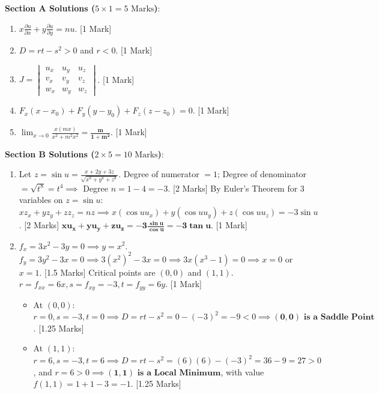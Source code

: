 \begin{solutionbox}
\noindent\textbf{Section A Solutions ($5 \times 1 = 5\text{ Marks}$)}:
\begin{enumerate}
    \item $x \frac{\partial u}{\partial x} + y \frac{\partial u}{\partial y} = n u$. [1 Mark]
    \item $D = rt - s^2 > 0$ and $r < 0$. [1 Mark]
    \item $J = \begin{vmatrix} u_x & u_y & u_z \\ v_x & v_y & v_z \\ w_x & w_y & w_z \end{vmatrix}$. [1 Mark]
    \item $F_x(x-x_0) + F_y(y-y_0) + F_z(z-z_0) = 0$. [1 Mark]
    \item $\lim_{x\to 0} \frac{x(mx)}{x^2+m^2 x^2} = \mathbf{\frac{m}{1+m^2}}$. [1 Mark]
\end{enumerate}

\medskip
\noindent\textbf{Section B Solutions ($2 \times 5 = 10\text{ Marks}$)}:
\begin{enumerate}[start=6]
    \item Let $z = \sin u = \frac{x+2y+3z}{\sqrt{x^8+y^8+z^8}}$.
    Degree of numerator $= 1$; Degree of denominator $= \sqrt{t^8} = t^4 \implies$ Degree $n = 1 - 4 = -3$. [2 Marks]
    By Euler's Theorem for 3 variables on $z = \sin u$:
    $x z_x + y z_y + z z_z = n z \implies x(\cos u u_x) + y(\cos u u_y) + z(\cos u u_z) = -3\sin u$. [2 Marks]
    $\mathbf{x u_x + y u_y + z u_z = -3\frac{\sin u}{\cos u} = -3\tan u}$. [1 Mark]

    \item $f_x = 3x^2 - 3y = 0 \implies y = x^2$.
    $f_y = 3y^2 - 3x = 0 \implies 3(x^2)^2 - 3x = 0 \implies 3x(x^3 - 1) = 0 \implies x = 0$ or $x = 1$. [1.5 Marks]
    Critical points are $(0,0)$ and $(1,1)$.
    $r = f_{xx} = 6x, s = f_{xy} = -3, t = f_{yy} = 6y$. [1 Mark]
    \begin{itemize}
        \item At $(0,0)$: $r = 0, s = -3, t = 0 \implies D = rt - s^2 = 0 - (-3)^2 = -9 < 0 \implies \mathbf{(0,0) \text{ is a Saddle Point}}$. [1.25 Marks]
        \item At $(1,1)$: $r = 6, s = -3, t = 6 \implies D = rt - s^2 = (6)(6) - (-3)^2 = 36 - 9 = 27 > 0$, and $r = 6 > 0 \implies \mathbf{(1,1) \text{ is a Local Minimum}}$, with value $f(1,1) = 1+1-3 = -1$. [1.25 Marks]
    \end{itemize}
\end{enumerate}


\end{solutionbox}
